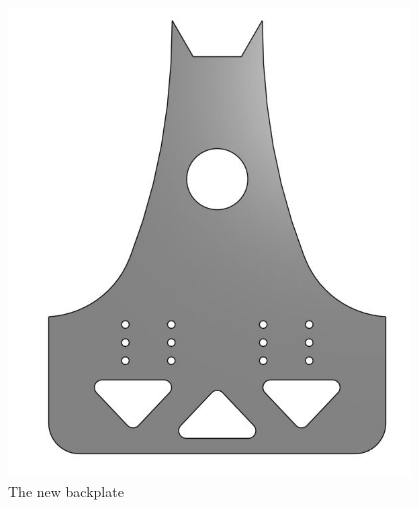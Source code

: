 \begin{figure}[ht]
\centering
\begin{minipage}[b]{.48\textwidth}
  \centering
  \includegraphics[width=0.95\textwidth]{Meetings/November/11-09-21/11-9-21_Hardware_Figure3 - Nathan Forrer.JPG}
  \caption{The new backplate}
  \label{fig:pic3}
\end{minipage}%
\hfill%
\begin{minipage}[b]{.48\textwidth}
  \centering

\end{minipage}
\end{figure}
